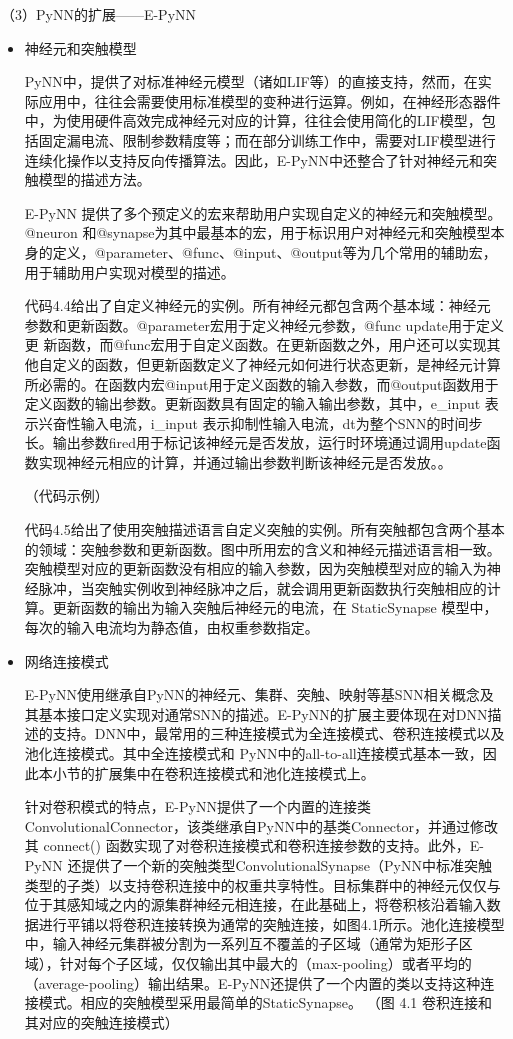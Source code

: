 （3）PyNN的扩展——E-PyNN
\begin{itemize}
    \item 神经元和突触模型
    
    PyNN中，提供了对标准神经元模型（诸如LIF等）的直接支持，然而，在实际应用中，往往会需要使用标准模型的变种进行运算。例如，在神经形态器件中，为使用硬件高效完成神经元对应的计算，往往会使用简化的LIF模型，包括固定漏电流、限制参数精度等；而在部分训练工作中，需要对LIF模型进行连续化操作以支持反向传播算法。因此，E-PyNN中还整合了针对神经元和突触模型的描述方法。

    E-PyNN 提供了多个预定义的宏来帮助用户实现自定义的神经元和突触模型。@neuron 和@synapse为其中最基本的宏，用于标识用户对神经元和突触模型本身的定义，@parameter、@func、@input、@output等为几个常用的辅助宏，用于辅助用户实现对模型的描述。

    代码4.4给出了自定义神经元的实例。所有神经元都包含两个基本域：神经元 参数和更新函数。@parameter宏用于定义神经元参数，@func update用于定义更 新函数，而@func宏用于自定义函数。在更新函数之外，用户还可以实现其他自定义的函数，但更新函数定义了神经元如何进行状态更新，是神经元计算所必需的。在函数内宏@input用于定义函数的输入参数，而@output函数用于定义函数的输出参数。更新函数具有固定的输入输出参数，其中，e\_input 表示兴奋性输入电流，i\_input 表示抑制性输入电流，dt为整个SNN的时间步长。输出参数fired用于标记该神经元是否发放，运行时环境通过调用update函数实现神经元相应的计算，并通过输出参数判断该神经元是否发放。。

    （代码示例）

    代码4.5给出了使用突触描述语言自定义突触的实例。所有突触都包含两个基本的领域：突触参数和更新函数。图中所用宏的含义和神经元描述语言相一致。突触模型对应的更新函数没有相应的输入参数，因为突触模型对应的输入为神经脉冲，当突触实例收到神经脉冲之后，就会调用更新函数执行突触相应的计算。更新函数的输出为输入突触后神经元的电流，在 StaticSynapse 模型中，每次的输入电流均为静态值，由权重参数指定。

    \item 网络连接模式

    E-PyNN使用继承自PyNN的神经元、集群、突触、映射等基SNN相关概念及其基本接口定义实现对通常SNN的描述。E-PyNN的扩展主要体现在对DNN描述的支持。DNN中，最常用的三种连接模式为全连接模式、卷积连接模式以及池化连接模式。其中全连接模式和 PyNN中的all-to-all连接模式基本一致，因此本小节的扩展集中在卷积连接模式和池化连接模式上。
    
    针对卷积模式的特点，E-PyNN提供了一个内置的连接类ConvolutionalConnector，该类继承自PyNN中的基类Connector，并通过修改其 connect() 函数实现了对卷积连接模式和卷积连接参数的支持。此外，E-PyNN 还提供了一个新的突触类型ConvolutionalSynapse（PyNN中标准突触类型的子类）以支持卷积连接中的权重共享特性。目标集群中的神经元仅仅与位于其感知域之内的源集群神经元相连接，在此基础上，将卷积核沿着输入数据进行平铺以将卷积连接转换为通常的突触连接，如图4.1所示。池化连接模型中，输入神经元集群被分割为一系列互不覆盖的子区域（通常为矩形子区域），针对每个子区域，仅仅输出其中最大的（max-pooling）或者平均的（average-pooling）输出结果。E-PyNN还提供了一个内置的类以支持这种连接模式。相应的突触模型采用最简单的StaticSynapse。
    （图 4.1 卷积连接和其对应的突触连接模式）


\end{itemize}
